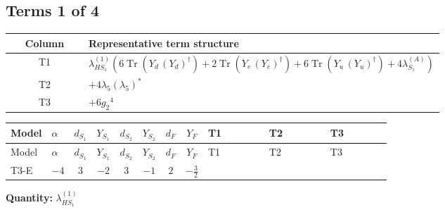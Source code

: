 \documentclass[8pt]{article}
\begin{document}
\begin{landscape}
\subsection*{Terms 1 of 4}
\begin{center}
\begin{tabular}{@{}c >{\raggedright\arraybackslash}p{0.82\linewidth}@{}}
\toprule
Column & Representative term structure \\
\midrule
T1 & \(\displaystyle {\lambda_{HS_1}^{(1)}} (6 \operatorname{Tr}\!\left({Y_d}\,\left({Y_d}\right)^{\dagger}\right)+2 \operatorname{Tr}\!\left({Y_e}\,\left({Y_e}\right)^{\dagger}\right)+6 \operatorname{Tr}\!\left({Y_u}\,\left({Y_u}\right)^{\dagger}\right)+4 {\lambda_{S_1}^{(A)}})\) \\
\midrule
T2 & \(\displaystyle +4 {\lambda_5} \left({\lambda_5}\right)^{*}\) \\
\midrule
T3 & \(\displaystyle +6 {g_2}^4\) \\
\midrule
\bottomrule
\end{tabular}
\end{center}
\smallskip
\tiny
\begin{longtable}{@{}llcccccc >{\raggedright\arraybackslash}p{0.21\linewidth} >{\raggedright\arraybackslash}p{0.21\linewidth} >{\raggedright\arraybackslash}p{0.21\linewidth}@{}}
\toprule
Model & $\alpha$ & $d_{S_1}$ & $Y_{S_1}$ & $d_{S_2}$ & $Y_{S_2}$ & $d_F$ & $Y_F$ & T1 & T2 & T3 \\
\midrule
\endfirsthead
\toprule
Model & $\alpha$ & $d_{S_1}$ & $Y_{S_1}$ & $d_{S_2}$ & $Y_{S_2}$ & $d_F$ & $Y_F$ & T1 & T2 & T3 \\
\midrule
\endhead
T3-E & $-4$ & $3$ & $-2$ & $3$ & $-1$ & $2$ & $-\frac{3}{2}$ & \scriptsize\adjustbox{max width=\linewidth}{$\begin{gathered} {\lambda_{HS_1}^{(1)}} (6 \operatorname{Tr}\!\left({Y_d}\,\left({Y_d}\right)^{\dagger}\right)+2 \operatorname{Tr}\!\left({Y_e}\,\left({Y_e}\right)^{\dagger}\right)+6 \operatorname{Tr}\!\left({Y_u}\,\left({Y_u}\right)^{\dagger}\right)+4 {\lambda_{S_1}^{(A)}})\end{gathered}$} & \scriptsize\adjustbox{max width=\linewidth}{$\begin{gathered} +4 {\lambda_5} \left({\lambda_5}\right)^{*}\end{gathered}$} & \scriptsize\adjustbox{max width=\linewidth}{$\begin{gathered} +6 {g_2}^4\end{gathered}$} \\
\midrule
\bottomrule
\end{longtable}
\clearpage
\noindent\textbf{Quantity: }$\lambda_{HS_1}^{(1)}$\par\smallskip

\end{landscape}
\end{document}
